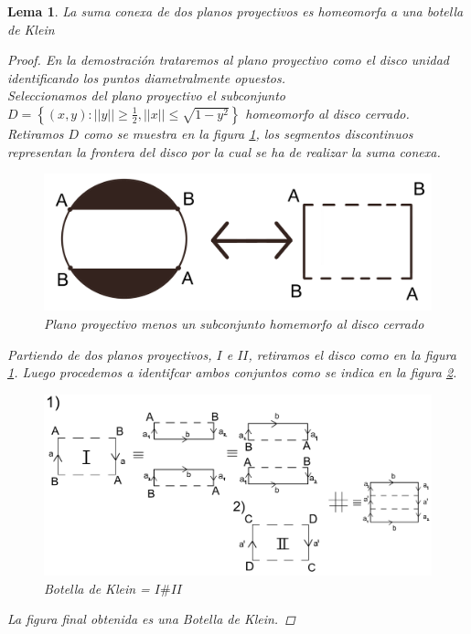 \documentclass[a4paper,11pt,spanish, twoside, leqno]{tfg-uam}
\newtheorem{lema}[teor]{Lema}
\theoremstyle{definition}
\begin{document}
\begin{lema}\label{lema:SumaDosPlanospEsKlein}
La suma conexa de dos planos proyectivos es homeomorfa a una botella de Klein

\begin{proof}
En la demostración trataremos al plano proyectivo como el disco unidad identificando los puntos diametralmente opuestos.\\
Seleccionamos del plano proyectivo el subconjunto $D = \left\{(x,y): ||y||\geq\frac{1}{2}, ||x||\leq\sqrt{1-y^2} \right\}$  homeomorfo al disco cerrado. Retiramos $ D $ como se muestra en la figura \ref{fig:planop sin D}, los segmentos discontinuos representan la frontera del disco por la cual se ha de realizar la suma conexa.

\begin{figure}[h!]
	\centering
	\includegraphics[width=0.4\linewidth]{imagenes/planop_sinD.png}
	\caption{Plano proyectivo menos un subconjunto homemorfo al disco cerrado}
	\label{fig:planop sin D}
\end{figure} 

Partiendo de dos planos proyectivos,  $I$ e $II$, retiramos el disco como en la figura \ref{fig:planop sin D}. Luego procedemos a identifcar ambos conjuntos como se indica en la figura \ref{fig:sumaconexadeppsEnLema}.

\begin{figure}[h!]
	\centering
	\includegraphics[width=0.8\linewidth]{imagenes/sumappsEnLema.png}
	\caption{Botella de Klein = $ I \# II$}
	\label{fig:sumaconexadeppsEnLema}
\end{figure} 

La figura final obtenida  es una Botella de Klein.
\end{proof}
\end{lema}
\end{document}
